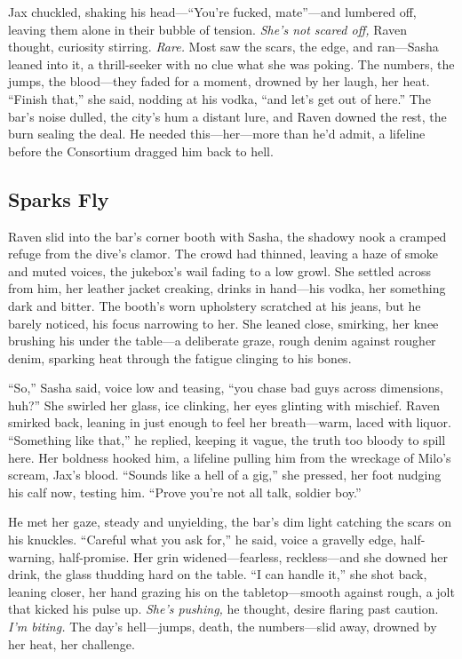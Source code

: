 \documentclass[12pt]{book}
\begin{document}
Jax chuckled, shaking his head—“You’re fucked, mate”—and lumbered off, leaving them alone in their bubble of tension. \textit{She’s not scared off,} Raven thought, curiosity stirring. \textit{Rare.} Most saw the scars, the edge, and ran—Sasha leaned into it, a thrill-seeker with no clue what she was poking. The numbers, the jumps, the blood—they faded for a moment, drowned by her laugh, her heat. “Finish that,” she said, nodding at his vodka, “and let’s get out of here.” The bar’s noise dulled, the city’s hum a distant lure, and Raven downed the rest, the burn sealing the deal. He needed this—her—more than he’d admit, a lifeline before the Consortium dragged him back to hell.

\subsection{Sparks Fly}

Raven slid into the bar’s corner booth with Sasha, the shadowy nook a cramped refuge from the dive’s clamor. The crowd had thinned, leaving a haze of smoke and muted voices, the jukebox’s wail fading to a low growl. She settled across from him, her leather jacket creaking, drinks in hand—his vodka, her something dark and bitter. The booth’s worn upholstery scratched at his jeans, but he barely noticed, his focus narrowing to her. She leaned close, smirking, her knee brushing his under the table—a deliberate graze, rough denim against rougher denim, sparking heat through the fatigue clinging to his bones.

“So,” Sasha said, voice low and teasing, “you chase bad guys across dimensions, huh?” She swirled her glass, ice clinking, her eyes glinting with mischief. Raven smirked back, leaning in just enough to feel her breath—warm, laced with liquor. “Something like that,” he replied, keeping it vague, the truth too bloody to spill here. Her boldness hooked him, a lifeline pulling him from the wreckage of Milo’s scream, Jax’s blood. “Sounds like a hell of a gig,” she pressed, her foot nudging his calf now, testing him. “Prove you’re not all talk, soldier boy.”

He met her gaze, steady and unyielding, the bar’s dim light catching the scars on his knuckles. “Careful what you ask for,” he said, voice a gravelly edge, half-warning, half-promise. Her grin widened—fearless, reckless—and she downed her drink, the glass thudding hard on the table. “I can handle it,” she shot back, leaning closer, her hand grazing his on the tabletop—smooth against rough, a jolt that kicked his pulse up. \textit{She’s pushing,} he thought, desire flaring past caution. \textit{I’m biting.} The day’s hell—jumps, death, the numbers—slid away, drowned by her heat, her challenge.
\end{document}
